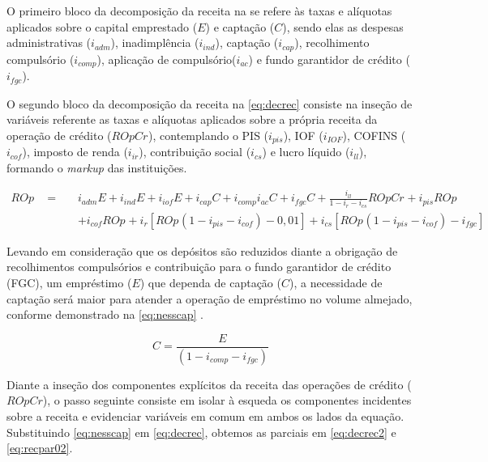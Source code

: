 \documentclass[
  12pt,
  12pt,
  openright,
  oneside,
  a4paper,
  chapter=TITLE,
  section=TITLE,
  subsection=TITLE,
  subsubsection=TITLE,
  portugues,
  sumario=tradicional]{abntex2}
\begin{document}
\begin{apendicesenv}
O primeiro bloco da decomposição da receita na se refere às taxas e alíquotas aplicados sobre o capital emprestado ($E$) e captação ($C$), sendo elas as despesas administrativas ($i_{adm}$), inadimplência ($i_{ind}$), captação ($i_{cap}$), recolhimento compulsório ($i_{comp}$), aplicação de compulsório($i_{ac}$) e fundo garantidor de crédito ($i_{fgc}$).

O segundo bloco da decomposição da receita na \autoref{eq:decrec} consiste na inseção de variáveis referente as taxas e alíquotas aplicados sobre a própria receita da operação de crédito ($ROpCr_{}$), contemplando o PIS ($i_{pis}$), IOF ($i_{IOF}$), COFINS ($i_{cof}$), imposto de renda ($i_{ir}$), contribuição social ($i_{cs}$) e lucro líquido ($i_{ll}$), formando o \emph{markup} das instituições.



\begin{equation}\label{eq:decrec}
\begin{aligned}
ROp_{} \hspace{10pt} = \hspace{10pt} &  i_{adm}E + i_{ind}E + i_{iof}E + i_{cap}C + i_{comp}i_{ac}C + i_{fgc}C + \frac{i_{ll}}{1 - i_{r} - i_{cs}}ROpCr_{} + i_{pis}ROp_{} \\ 
& + i_{cof}ROp_{} +  i_{r} [ROp_{}(1-i_{pis} - i_{cof}) - 0,01] + i_{cs} [ROp_{}(1-i_{pis} - i_{cof}) - i_{fgc}]
\end{aligned}
\end{equation}

  
Levando em consideração que os depósitos são reduzidos diante a obrigação de recolhimentos compulsórios e contribuição para o fundo garantidor de crédito (FGC), um empréstimo ($E$) que dependa de captação ($C$), a necessidade de captação será maior para atender a operação de empréstimo no volume almejado, conforme demonstrado na \autoref{eq:nesscap} \cite{cardoso:1999}.



\begin{equation}\label{eq:nesscap}
C = \frac{E}{(1 - i_{comp} - i_{fgc})}
\end{equation}


Diante a inseção dos componentes explícitos da receita das operações de crédito ($ROpCr$), o passo seguinte consiste em isolar à esqueda os componentes incidentes sobre a receita e evidenciar variáveis em comum em ambos os lados da equação. Substituindo \autoref{eq:nesscap} em \autoref{eq:decrec}, obtemos as parciais em \autoref{eq:decrec2} e \autoref{eq:recpar02}. 



\end{apendicesenv}
\end{document}
